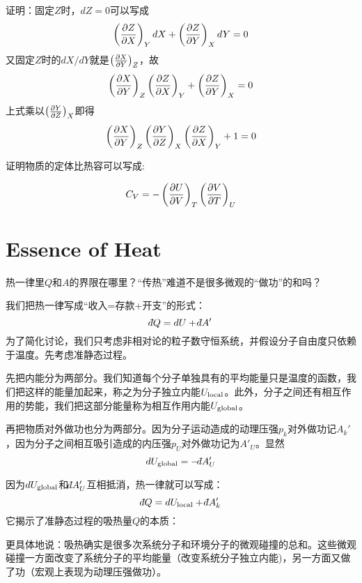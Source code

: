 \documentclass[CJK]{beamer}
\begin{document}
\begin{frame}
\bch
{\scriptsize
证明：固定$Z$时，$dZ = 0$可以写成
$$\left(\frac{\partial Z}{\partial X}\right)_{Y} dX + \left(\frac{\partial Z}{\partial Y}\right)_{X} dY = 0$$
又固定$Z$时的$dX/dY$就是$\left(\frac{\partial X}{\partial Y}\right)_{Z}$，故
$$\left(\frac{\partial X}{\partial Y}\right)_{Z} \left(\frac{\partial Z}{\partial X}\right)_{Y} + \left(\frac{\partial Z}{\partial Y}\right)_{X} = 0$$
上式乘以$\left(\frac{\partial Y}{\partial Z}\right)_{X}$即得
$$\left(\frac{\partial X}{\partial Y}\right)_{Z} \left(\frac{\partial Y}{\partial Z}\right)_{X} \left(\frac{\partial Z}{\partial X}\right)_{Y} + 1 = 0$$
}
\ech
\end{frame}


\begin{frame}
\bch
{}

证明物质的定体比热容可以写成:

$$
C_V =  - \left(\frac{\partial U}{\partial V}\right)_{T} \left(\frac{\partial V}{\partial T}\right)_{U} 
$$

\ech
\end{frame}


\section{Essence of Heat}

\begin{frame}
\bch


热一律里$Q$和$A$的界限在哪里？“传热”难道不是很多微观的“做功”的和吗？

\ech
\end{frame}


\begin{frame}
\bch
我们把热一律写成“收入=存款+开支”的形式：
$$ \dbar Q =  d U + \dbar A'$$
为了简化讨论，我们只考虑非相对论的粒子数守恒系统，并假设分子自由度只依赖于温度。先考虑准静态过程。

\skipline

先把内能分为两部分。我们知道每个分子单独具有的平均能量只是温度的函数，我们把这样的能量加起来，称之为{\blue 分子独立内能$U_{\rm local}$}。此外，分子之间还有相互作用的势能，我们把这部分能量称为{\blue 相互作用内能$U_{\rm global}$}。


再把物质对外做功也分为两部分。因为分子运动造成的{\blue 动理压强$p_k$对外做功记$ A_k'$}，因为分子之间相互吸引造成的{\blue 内压强$p_U$对外做功记为$ A'_U$}。显然
{\blue
$$ d U_{\rm global} = - \dbar A'_U$$
}
\ech
\end{frame}


\begin{frame}
\bch
因为$d U_{\rm global}$和$\dbar A'_U$互相抵消，热一律就可以写成：
$$ \dbar Q = d U_{\rm local}  +\dbar A'_k  $$
它揭示了准静态过程的吸热量$Q$的本质：


更具体地说：吸热确实是很多次系统分子和环境分子的微观碰撞的总和。这些微观碰撞一方面改变了系统分子的平均能量（改变系统分子独立内能)，另一方面又做了功（宏观上表现为动理压强做功）。


\ech
\end{frame}
\end{document}
